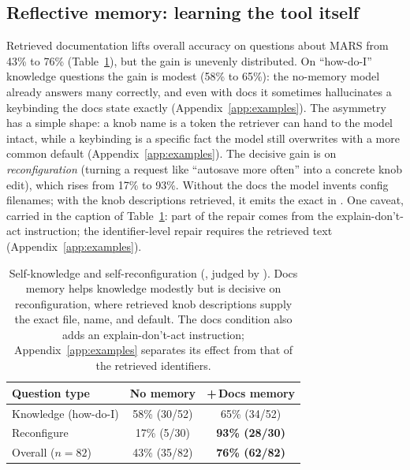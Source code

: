 \subsection{Reflective memory: learning the tool itself}

Retrieved documentation lifts overall accuracy on questions about MARS from 43\% to
76\% (Table~\ref{tab:axisB}), but the gain is unevenly distributed.
On ``how-do-I'' knowledge questions the gain is modest (58\% to 65\%): the no-memory
model already answers many correctly, and even with docs it sometimes hallucinates a
keybinding the docs state exactly (Appendix~\ref{app:examples}). The asymmetry has a
simple shape: a knob name is a token the retriever can hand to the model intact, while
a keybinding is a specific fact the model still overwrites with a more common default
(Appendix~\ref{app:examples}). The decisive gain is on \emph{reconfiguration}
(turning a request like ``autosave more often'' into a concrete knob edit), which
rises from 17\% to 93\%. Without the docs the model invents config filenames; with
the knob descriptions retrieved, it emits the exact  in
. One caveat, carried in the caption of Table~\ref{tab:axisB}:
part of the repair comes from the explain-don't-act instruction; the identifier-level
repair requires the retrieved text (Appendix~\ref{app:examples}).

\begin{table}[t]
\centering
\footnotesize
\begin{tabular}{@{}lcc@{}}
\toprule
\textbf{Question type} & \textbf{No memory} & \textbf{+\,Docs memory} \\
\midrule
Knowledge (how-do-I)   & 58\% (30/52) & 65\% (34/52) \\
Reconfigure            & 17\% (5/30)  & \textbf{93\% (28/30)} \\
Overall ($n{=}82$)     & 43\% (35/82) & \textbf{76\% (62/82)} \\
\bottomrule
\end{tabular}
\caption{Self-knowledge and self-reconfiguration (, judged by
). Docs memory helps knowledge modestly but is decisive on
reconfiguration, where retrieved knob descriptions supply the exact file, name, and
default. The docs condition also adds an explain-don't-act instruction;
Appendix~\ref{app:examples} separates its effect from that of the retrieved
identifiers.}
\label{tab:axisB}
\end{table}
